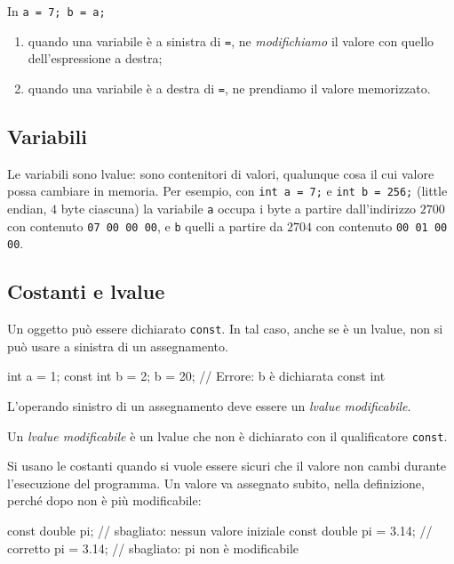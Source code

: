 \documentclass[11pt,a4paper]{article}
\begin{document}
In \lstinline|a = 7; b = a;|
\begin{enumerate}
    \item quando una variabile è a sinistra di \lstinline|=|, ne \emph{modifichiamo} il valore con quello dell'espressione a destra;
    \item quando una variabile è a destra di \lstinline|=|, ne prendiamo il valore memorizzato.
\end{enumerate}

\subsection{Variabili}

Le variabili sono lvalue: sono contenitori di valori, qualunque cosa il cui valore possa cambiare in memoria. Per esempio, con \lstinline|int a = 7;| e \lstinline|int b = 256;| (little endian, $4$ byte ciascuna) la variabile \lstinline|a| occupa i byte a partire dall'indirizzo $2700$ con contenuto \texttt{07 00 00 00}, e \lstinline|b| quelli a partire da $2704$ con contenuto \texttt{00 01 00 00}.

\subsection{Costanti e lvalue}

Un oggetto può essere dichiarato \lstinline|const|. In tal caso, anche se è un lvalue, non si può usare a sinistra di un assegnamento.

\begin{codice}
int a = 1;
const int b = 2;
b = 20;      // Errore: b è dichiarata const int
\end{codice}

L'operando sinistro di un assegnamento deve essere un \emph{lvalue modificabile}.

\begin{definizione}
Un \emph{lvalue modificabile} è un lvalue che non è dichiarato con il qualificatore \lstinline|const|.
\end{definizione}

Si usano le costanti quando si vuole essere sicuri che il valore non cambi durante l'esecuzione del programma. Un valore va assegnato subito, nella definizione, perché dopo non è più modificabile:

\begin{codice}
const double pi;         // sbagliato: nessun valore iniziale
const double pi = 3.14;  // corretto
pi = 3.14;               // sbagliato: pi non è modificabile
\end{codice}
\end{document}
